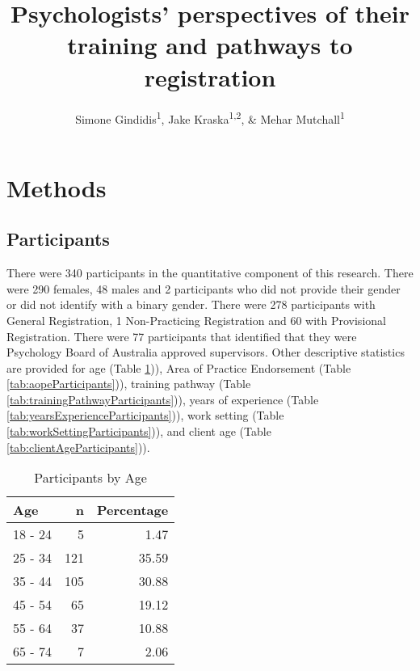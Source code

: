 \documentclass[
  english,
  man]{apa6}
\title{Psychologists' perspectives of their training and pathways to registration}
\author{Simone Gindidis\textsuperscript{1}, Jake Kraska\textsuperscript{1,2}, \& Mehar Mutchall\textsuperscript{1}}
\date{}
\affiliation{\vspace{0.5cm}\textsuperscript{1} Faculty of Education, Monash University\\\textsuperscript{2} Krongold Clinic, Monash University}
\begin{document}
\maketitle

\hypertarget{methods}{%
\section{Methods}\label{methods}}

\hypertarget{participants}{%
\subsection{Participants}\label{participants}}

There were 340 participants in the quantitative component of this research. There were 290 females, 48 males and 2 participants who did not provide their gender or did not identify with a binary gender. There were 278 participants with General Registration, 1 Non-Practicing Registration and 60 with Provisional Registration. There were 77 participants that identified that they were Psychology Board of Australia approved supervisors. Other descriptive statistics are provided for age (Table \ref{tab:ageParticipants})), Area of Practice Endorsement (Table \ref{tab:aopeParticipants})), training pathway (Table \ref{tab:trainingPathwayParticipants})), years of experience (Table \ref{tab:yearsExperienceParticipants})), work setting (Table \ref{tab:workSettingParticipants})), and client age (Table \ref{tab:clientAgeParticipants})).

\begin{table}

\caption{\label{tab:ageParticipants}Participants by Age}
\centering
\begin{tabular}[t]{l|r|r}
\hline
Age & n & Percentage\\
\hline
18 - 24 & 5 & 1.47\\
\hline
25 - 34 & 121 & 35.59\\
\hline
35 - 44 & 105 & 30.88\\
\hline
45 - 54 & 65 & 19.12\\
\hline
55 - 64 & 37 & 10.88\\
\hline
65 - 74 & 7 & 2.06\\
\hline
\end{tabular}
\end{table}
\end{document}
